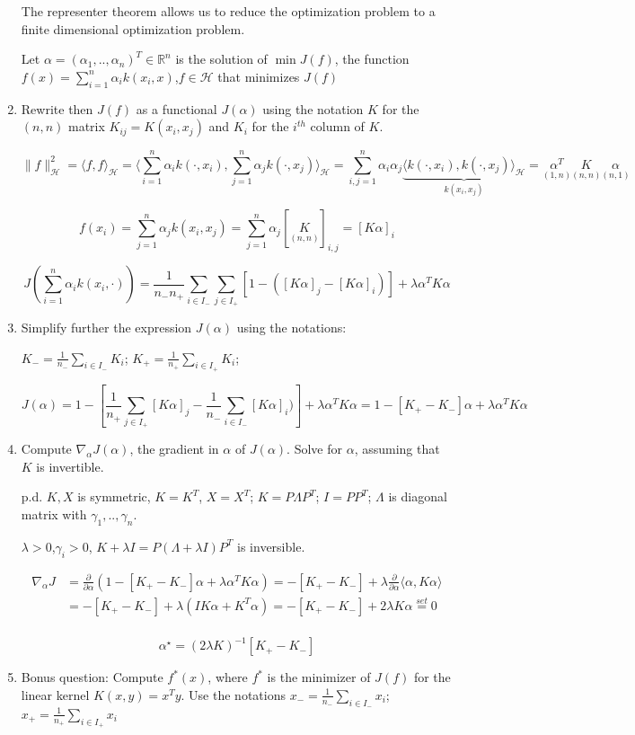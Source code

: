 \documentclass[11pt]{article}
\begin{document}
\begin{enumerate}
The representer theorem allows us to reduce the optimization problem to a finite dimensional optimization problem.

Let $\alpha=(\alpha_1,..,\alpha_n)^T\in\mathbb{R}^n$ is the solution of $\min J(f)$, the function $f(x)=\sum_{i=1}^n \alpha_i k(x_i,x)$,$f \in\mathcal{H}$ that minimizes $J(f)$

\item Rewrite then $J(f)$ as a functional $J(\alpha)$ using the notation  $K$ for the $(n,n)$ matrix $K_{ij}=K(x_i,x_j)$ and $K_i$ for the $i^{th}$ column of $K$.

$$\|f\|^2_{\mathcal{H}}=\langle f,f\rangle_{\mathcal{H}}=\langle \sum_{i=1}^n\alpha_i k(\cdot,x_i),\sum_{j=1}^n\alpha_j k(\cdot,x_j)\rangle_{\mathcal{H}}=\sum_{i,j=1}^n\alpha_i\alpha_j\underbrace{\langle k(\cdot,x_i),k(\cdot,x_j)\rangle_{\mathcal{H}}}_{k(x_i,x_j)}=\underset{(1,n)}{\alpha^T}\underset{(n,n)}{K}\underset{(n,1)}{\alpha}$$

$$f(x_i)=\sum_{j=1}^n\alpha_j k(x_i,x_j)=\sum_{j=1}^n\alpha_j[\underset{(n,n)}{K}]_{i,j}=[K\alpha]_i$$

$$J(\sum_{i=1}^n\alpha_i k(x_i,\cdot))=\frac{1}{n_- n_+}\sum_{i \in I_-}\sum_{j \in I_+} [1-([K\alpha]_j-[K\alpha]_i)]+ \lambda \alpha^T{K}\alpha$$



\item Simplify further the expression $J(\alpha)$ using the notations:

$K_-=\frac{1}{n_-}\sum_{i \in I_-}K_i$;
$K_+=\frac{1}{n_+}\sum_{i \in I_+}K_i$;

$$J(\alpha)=1-[\frac{1}{n_+}\sum_{j \in I_+}[K\alpha]_j-\frac{1}{n_-}\sum_{i \in I_-}[K\alpha]_i)]+ \lambda \alpha^T{K}\alpha=1-[K_+-K_-]\alpha+ \lambda \alpha^T{K}\alpha$$


\item Compute $\nabla_\alpha J(\alpha)$, the gradient in $\alpha$ of $J(\alpha)$. Solve for $\alpha$, assuming that $K$ 
is invertible. 

p.d. $K,X$ is symmetric, $K=K^T$, $X=X^T$; $K=P\Lambda P^T$; $I=PP^T$; $\Lambda$ is diagonal matrix with $\gamma_1,..,\gamma_n$.

$\lambda>0$,$\gamma_i>0$, $K+\lambda I=P(\Lambda+\lambda I) P^T$ is inversible.

\begin{align*}
\nabla_\alpha J&=\frac{\partial}{\partial\alpha}(1-[K_+-K_-]\alpha+ \lambda \alpha^T{K}\alpha)=-[K_+-K_-]+ \lambda \frac{\partial}{\partial\alpha}\langle\alpha,K\alpha\rangle\\
&=-[K_+-K_-]+ \lambda (IK\alpha+K^T\alpha)=-[K_+-K_-]+2\lambda K\alpha\overset{set}{=}0\\
\end{align*}

$$\alpha^\star=(2\lambda K)^{-1}[K_+-K_-]$$

\item Bonus question: Compute $f^*(x)$, where $f^*$ is the minimizer of $J(f)$ for the linear kernel $K(x,y)=x^Ty$. Use the notations
${x}_-=\frac{1}{n_-}\sum_{i \in I_-}x_i$;
${x}_+=\frac{1}{n_+}\sum_{i \in I_+}x_i$

\end{enumerate}
\end{document}
